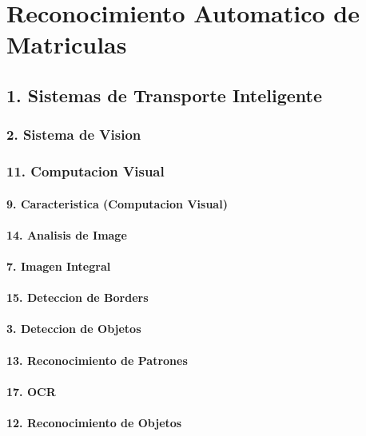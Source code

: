 \chapter{Reconocimiento Automatico de Matriculas}

\section{1. Sistemas de Transporte Inteligente}

	\subsection{2. Sistema de Vision}

	\subsection{11. Computacion Visual}

	    \subsubsection{9. Caracteristica (Computacion Visual)}
	    \subsubsection{14. Analisis de Image}
	    \subsubsection{7. Imagen Integral}
	    \subsubsection{15. Deteccion de Borders}
	    \subsubsection{3. Deteccion de Objetos}
	    \subsubsection{13. Reconocimiento de Patrones}
	    \subsubsection{17. OCR }
	    \subsubsection{12. Reconocimiento de Objetos}

